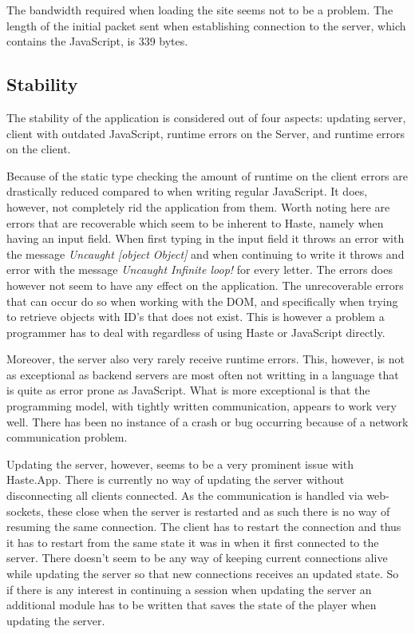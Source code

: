 \documentclass[a4paper]{article}
\begin{document}
The bandwidth required when loading the site seems not to be a problem. The length of the initial packet sent when establishing connection to the server, which contains the JavaScript, is 339 bytes. 



\subsection{Stability}
The stability of the application is considered out of four aspects: updating server, client with outdated JavaScript, runtime errors on the Server, and runtime errors on the client. 

Because of the static type checking the amount of runtime on the client errors are drastically reduced compared to when writing regular JavaScript. It does, however, not completely rid the application from them. Worth noting here are errors that are recoverable which seem to be inherent to Haste, namely when having an input field. When first typing in the input field it throws an error with the message \textit{Uncaught [object Object]} and when continuing to write it throws and error with the message \textit{Uncaught Infinite loop!} for every letter. The errors does however not seem to have any effect on the application. The unrecoverable errors that can occur do so when working with the DOM, and specifically when trying to retrieve objects with ID's that does not exist. This is however a problem a programmer has to deal with regardless of using Haste or JavaScript directly. 

Moreover, the server also very rarely receive runtime errors. This, however, is not as exceptional as backend servers are most often not writting in a language that is quite as error prone as JavaScript. What is more exceptional is that the programming model, with tightly written communication, appears to work very well. There has been no instance of a crash or bug occurring because of a network communication problem. 

Updating the server, however, seems to be a very prominent issue with Haste.App. There is currently no way of updating the server without disconnecting all clients connected. As the communication is handled via web-sockets, these close when the server is restarted and as such there is no way of resuming the same connection. The client has to restart the connection and thus it has to restart from the same state it was in when it first connected to the server. There doesn't seem to be any way of keeping current connections alive while updating the server so that new connections receives an updated state. So if there is any interest in continuing a session when updating the server an additional module has to be written that saves the state of the player when updating the server.
\end{document}

